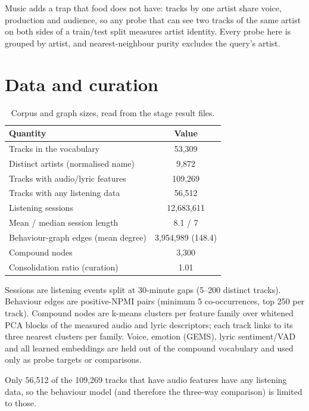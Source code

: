 \documentclass[11pt,a4paper]{article}
\begin{document}
Music adds a trap that food does not have: tracks by one artist share voice, production and audience, so any probe that can see two tracks of the same artist on both sides of a train/test split measures artist identity. Every probe here is grouped by artist, and nearest-neighbour purity excludes the query's artist.

\section*{Data and curation}
\begin{table}[h]\centering\small
\begin{tabular}{lc}
\toprule
\textbf{Quantity} & \textbf{Value} \\
\midrule
Tracks in the vocabulary & 53,309 \\
Distinct artists (normalised name) & 9,872 \\
Tracks with audio/lyric features & 109,269 \\
Tracks with any listening data & 56,512 \\
Listening sessions & 12,683,611 \\
Mean / median session length & 8.1 / 7 \\
Behaviour-graph edges (mean degree) & 3,954,989 (148.4) \\
Compound nodes & 3,300 \\
Consolidation ratio (curation) & 1.01 \\
\bottomrule
\end{tabular}
\caption{Corpus and graph sizes, read from the stage result files.}
\end{table}

Sessions are listening events split at 30-minute gaps (5--200 distinct tracks). Behaviour edges are positive-NPMI pairs (minimum 5 co-occurrences, top 250 per track). Compound nodes are k-means clusters per feature family over whitened PCA blocks of the measured audio and lyric descriptors; each track links to its three nearest clusters per family. Voice, emotion (GEMS), lyric sentiment/VAD and all learned embeddings are held out of the compound vocabulary and used only as probe targets or comparisons.

Only 56,512 of the 109,269 tracks that have audio features have any listening data, so the behaviour model (and therefore the three-way comparison) is limited to those.
\end{document}
